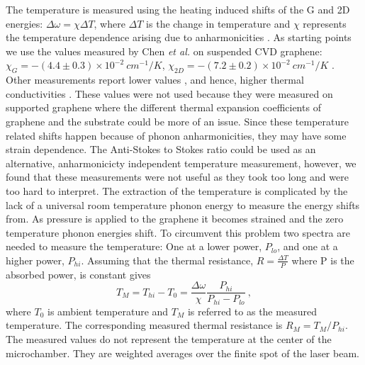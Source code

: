 The temperature is measured using the heating induced shifts of the G and 2D energies: $\Delta \omega=\chi \Delta T$, where $\Delta T$ is the change in temperature and $\chi$ represents the temperature dependence arising due to anharmonicities \cite{Bonini2007}.
As starting points we use the values measured by Chen \textit{et al.} on suspended CVD graphene: $\chi_G=-(4.4 \pm 0.3) \times 10^{-2} \ cm^{-1}/K$, $\chi_{2D}=-(7.2 \pm 0.2) \times 10^{-2} \ cm^{-1}/K$ \cite{Chen2011a}.
Other measurements report lower values \cite{Calizo2007}, and hence, higher thermal conductivities \cite{Balandin2008}.
These values were not used because they were measured on supported graphene where the different thermal expansion coefficients of graphene and the substrate could be more of an issue.
Since these temperature related shifts happen because of phonon anharmonicities, they may have some strain dependence.
The Anti-Stokes to Stokes ratio could be used as an alternative, anharmonicicty independent temperature measurement, however, we found that these measurements were not useful as they took too long and were too hard to interpret.
The extraction of the temperature is complicated by the lack of a universal room temperature phonon energy to measure the energy shifts from.
As pressure is applied to the graphene it becomes strained and the zero temperature phonon energies shift.
To circumvent this problem two spectra are needed to measure the temperature: One at a lower power, $P_{lo}$, and one at a higher power, $P_{hi}$.
Assuming that the thermal resistance, $R=\frac{\Delta T}{P}$ where P is the absorbed power, is constant gives
\begin{equation}
	T_M=T_{hi}-T_0=\frac{\Delta \omega}{\chi} \frac{P_{hi}}{P_{hi}-P_{lo}} \ , \label{eq:therm:TM}
\end{equation}
where $T_0$ is ambient temperature and $T_M$ is referred to as the measured temperature.
The corresponding measured thermal resistance is $R_M=T_M/P_{hi}$.
The measured values do not represent the temperature at the center of the microchamber.
They are weighted averages over the finite spot of the laser beam.

